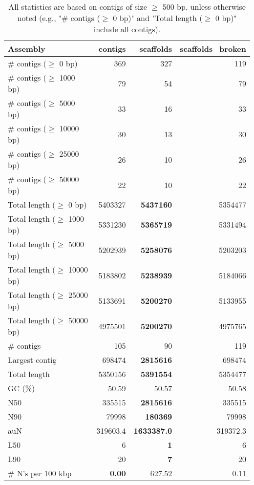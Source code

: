 \documentclass[12pt,a4paper]{article}
\begin{document}
\begin{table}[ht]
\begin{center}
\caption{All statistics are based on contigs of size $\geq$ 500 bp, unless otherwise noted (e.g., "\# contigs ($\geq$ 0 bp)" and "Total length ($\geq$ 0 bp)" include all contigs).}
\begin{tabular}{|l*{3}{|r}|}
\hline
Assembly & contigs & scaffolds & scaffolds\_broken \\ \hline
\# contigs ($\geq$ 0 bp) & 369 & 327 & 119 \\ \hline
\# contigs ($\geq$ 1000 bp) & 79 & 54 & 79 \\ \hline
\# contigs ($\geq$ 5000 bp) & 33 & 16 & 33 \\ \hline
\# contigs ($\geq$ 10000 bp) & 30 & 13 & 30 \\ \hline
\# contigs ($\geq$ 25000 bp) & 26 & 10 & 26 \\ \hline
\# contigs ($\geq$ 50000 bp) & 22 & 10 & 22 \\ \hline
Total length ($\geq$ 0 bp) & 5403327 & {\bf 5437160} & 5354477 \\ \hline
Total length ($\geq$ 1000 bp) & 5331230 & {\bf 5365719} & 5331494 \\ \hline
Total length ($\geq$ 5000 bp) & 5202939 & {\bf 5258076} & 5203203 \\ \hline
Total length ($\geq$ 10000 bp) & 5183802 & {\bf 5238939} & 5184066 \\ \hline
Total length ($\geq$ 25000 bp) & 5133691 & {\bf 5200270} & 5133955 \\ \hline
Total length ($\geq$ 50000 bp) & 4975501 & {\bf 5200270} & 4975765 \\ \hline
\# contigs & 105 & 90 & 119 \\ \hline
Largest contig & 698474 & {\bf 2815616} & 698474 \\ \hline
Total length & 5350156 & {\bf 5391554} & 5354477 \\ \hline
GC (\%) & 50.59 & 50.57 & 50.58 \\ \hline
N50 & 335515 & {\bf 2815616} & 335515 \\ \hline
N90 & 79998 & {\bf 180369} & 79998 \\ \hline
auN & 319603.4 & {\bf 1633387.0} & 319372.3 \\ \hline
L50 & 6 & {\bf 1} & 6 \\ \hline
L90 & 20 & {\bf 7} & 20 \\ \hline
\# N's per 100 kbp & {\bf 0.00} & 627.52 & 0.11 \\ \hline
\end{tabular}
\end{center}
\end{table}
\end{document}
